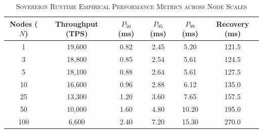 \begin{table}[t]
\centering
\caption{\textsc{Sovereign Runtime Empirical Performance Metrics across Node Scales}}
\label{tab:sovereign_metrics}
\small
\begin{tabular}{cccccc}
\toprule
\textbf{Nodes ($N$)} & \textbf{Throughput (TPS)} & \textbf{$P_{50}$ (ms)} & \textbf{$P_{95}$ (ms)} & \textbf{$P_{99}$ (ms)} & \textbf{Recovery (ms)} \\
\midrule
1   & 19,600 & 0.82 & 2.45 & 5.20  & 121.5 \\
3   & 18,800 & 0.85 & 2.54 & 5.61  & 124.5 \\
5   & 18,100 & 0.88 & 2.64 & 5.61  & 127.5 \\
10  & 16,600 & 0.96 & 2.88 & 6.12  & 135.0 \\
25  & 13,300 & 1.20 & 3.60 & 7.65  & 157.5 \\
50  & 10,000 & 1.60 & 4.80 & 10.20 & 195.0 \\
100 & 6,600  & 2.40 & 7.20 & 15.30 & 270.0 \\
\bottomrule
\end{tabular}
\end{table}
